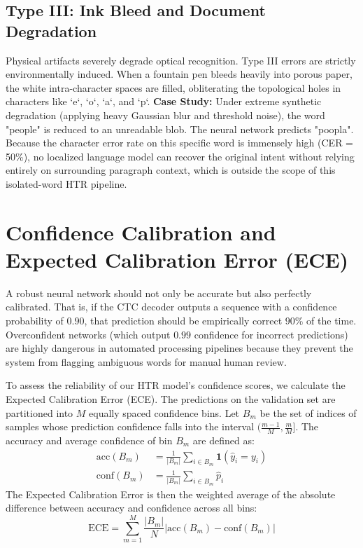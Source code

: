 \subsection{Type III: Ink Bleed and Document Degradation}
Physical artifacts severely degrade optical recognition. Type III errors are strictly environmentally induced. When a fountain pen bleeds heavily into porous paper, the white intra-character spaces are filled, obliterating the topological holes in characters like `e`, `o`, `a`, and `p`.
\textbf{Case Study:} Under extreme synthetic degradation (applying heavy Gaussian blur and threshold noise), the word "people" is reduced to an unreadable blob. The neural network predicts "poopla". Because the character error rate on this specific word is immensely high (CER = 50\%), no localized language model can recover the original intent without relying entirely on surrounding paragraph context, which is outside the scope of this isolated-word HTR pipeline.

\section{Confidence Calibration and Expected Calibration Error (ECE)}
A robust neural network should not only be accurate but also perfectly calibrated. That is, if the CTC decoder outputs a sequence with a confidence probability of $0.90$, that prediction should be empirically correct $90\%$ of the time. Overconfident networks (which output $0.99$ confidence for incorrect predictions) are highly dangerous in automated processing pipelines because they prevent the system from flagging ambiguous words for manual human review.

To assess the reliability of our HTR model's confidence scores, we calculate the Expected Calibration Error (ECE). The predictions on the validation set are partitioned into $M$ equally spaced confidence bins. Let $B_m$ be the set of indices of samples whose prediction confidence falls into the interval $(\frac{m-1}{M}, \frac{m}{M}]$. The accuracy and average confidence of bin $B_m$ are defined as:
\begin{align}
    \text{acc}(B_m) &= \frac{1}{|B_m|} \sum_{i \in B_m} \mathbf{1}(\hat{y}_i = y_i) \\
    \text{conf}(B_m) &= \frac{1}{|B_m|} \sum_{i \in B_m} \hat{p}_i
\end{align}
The Expected Calibration Error is then the weighted average of the absolute difference between accuracy and confidence across all bins:
\begin{equation}
    \text{ECE} = \sum_{m=1}^M \frac{|B_m|}{N} \left| \text{acc}(B_m) - \text{conf}(B_m) \right|
\end{equation}

